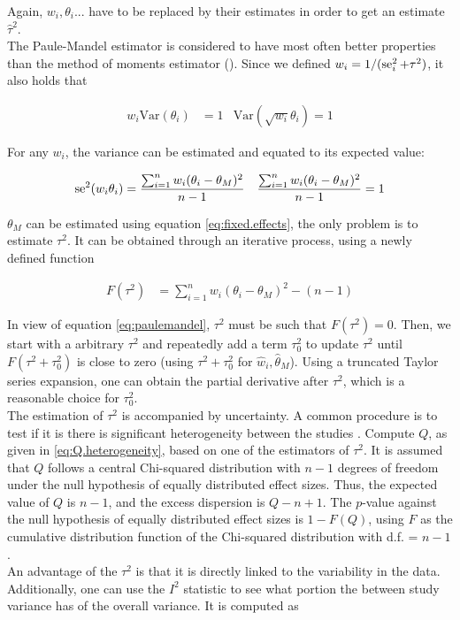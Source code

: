 \documentclass[11pt,a4paper,twoside]{book}\usepackage[]{graphicx}\usepackage[]{color}
\begin{document}
Again, $w_i, \theta_i ...$ have to be replaced by their estimates in order to get an estimate $\hat{\tau}^2$. \\
The Paule-Mandel estimator \citep{paulemandel} is considered to have most often better properties than the method of moments estimator (\eg \citet{tau.estimator.evaluation}).
Since we defined $w_i = 1/(\operatorname{se}_i^2 + \tau^2)$, it also holds that

\begin{align}
w_i \textrm{Var}(\theta_i) &= 1 & \textrm{Var}(\sqrt{w_i}\theta_i) = 1 \nonumber
\end{align}

For any $w_i$, the variance can be estimated and equated to its expected value:

\begin{align}
\operatorname{se}^2(w_i\theta_i) &= \frac{\sum_{i = 1}^n w_i(\theta_i - \theta_M)^2}{n-1} & \frac{\sum_{i = 1}^n w_i(\theta_i - \theta_M)^2}{n-1} = 1 \label{eq:paulemandel}
\end{align}

$\theta_M$ can be estimated using equation \ref{eq:fixed.effects}, the only problem is to estimate $\tau^2$. It can be obtained through an iterative process, using a newly defined function

\begin{align}
F(\tau^2) &= \sum_{i = 1}^n w_i(\theta_i - \theta_M)^2 - (n-1) \nonumber
\end{align}

In view of equation \ref{eq:paulemandel}, $\tau^2$ must be such that $F(\tau^2) = 0$. Then, we start with a arbitrary $\tau^2$ and repeatedly add a term $\tau_0^2$ to update $\tau^2$ until $F(\tau^2 + \tau_0^2)$ is close to zero (using $\tau^2 + \tau_0^2$ for $\hat{w}_i, \hat{\theta}_M$). Using a truncated Taylor series expansion, one can obtain the partial derivative after $\tau^2$, which is a reasonable choice for $\tau_0^2$. \\
The estimation of $\tau^2$ is accompanied by uncertainty. A common procedure is to test if it is there is significant heterogeneity between the studies \cite[109]{Intro.meta}. Compute $Q$, as given in \ref{eq:Q.heterogeneity}, based on one of the estimators of $\tau^2$. It is assumed that $Q$ follows a central Chi-squared distribution with $n -1$ degrees of freedom under the null hypothesis of equally distributed effect sizes. Thus, the expected value of $Q$ is $n-1$, and the excess dispersion is $Q - n + 1$. The $p$-value against the null hypothesis of equally distributed effect sizes is $1 - F(Q)$, using $F$ as the cumulative distribution function of the Chi-squared distribution with d.f. = $n-1$. \\
An advantage of the $\tau^2$ is that it is directly linked to the variability in the data. Additionally, one can use the $I^2$ statistic to see what portion the between study variance has of the overall variance. It is computed as
\end{document}
